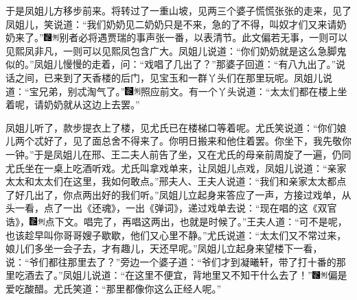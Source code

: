 于是凤姐儿方移步前来。将转过了一重山坡，见两三个婆子慌慌张张的走来，见了凤姐儿，笑说道：``我们奶奶见二奶奶只是不来，急的了不得，叫奴才们又来请奶奶来了。''{\includegraphics[width=3mm]{../Images/00006}\includegraphics[width=3mm]{../Images/00011}\footnotesize \kaishu 别者必将遇贾瑞的事声张一番，以表清节。此文偏若无事，一则可以见熙凤非凡，一则可以见熙凤包含广大。}凤姐儿说道：``你们奶奶就是这么急脚鬼似的。''凤姐儿慢慢的走着，问：``戏唱了几出了？''那婆子回道：``有八九出了。''说话之间，已来到了天香楼的后门，见宝玉和一群丫头们在那里玩呢。凤姐儿说道：``宝兄弟，别忒淘气了。''{\includegraphics[width=3mm]{../Images/00006}\includegraphics[width=3mm]{../Images/00011}\footnotesize \kaishu 照应前文。}有一个丫头说道：``太太们都在楼上坐着呢，请奶奶就从这边上去罢。''

凤姐儿听了，款步提衣上了楼，见尤氏已在楼梯口等着呢。尤氏笑说道：``你们娘儿两个忒好了，见了面总舍不得来了。你明日搬来和他住着罢。你坐下，我先敬你一钟。''于是凤姐儿在邢、王二夫人前告了坐，又在尤氏的母亲前周旋了一遍，仍同尤氏坐在一桌上吃酒听戏。尤氏叫拿戏单来，让凤姐儿点戏，凤姐儿说道：``亲家太太和太太们在这里，我如何敢点。''邢夫人、王夫人说道：``我们和亲家太太都点了好几出了，你点两出好的我们听。''凤姐儿立起身来答应了一声，方接过戏单，从头一看，点了一出《还魂》，一出《弹词》，递过戏单去说：``现在唱的这《双官诰》，{\includegraphics[width=3mm]{../Images/00006}\includegraphics[width=3mm]{../Images/00011}\footnotesize \kaishu 点下文。}唱完了，再唱这两出，也就是时候了。''王夫人道：``可不是呢，也该趁早叫你哥哥嫂子歇歇，他们又心里不静。''尤氏说道：``太太们又不常过来，娘儿们多坐一会子去，才有趣儿，天还早呢。''凤姐儿立起身来望楼下一看，说：``爷们都往那里去了？''旁边一个婆子道：``爷们才到凝曦轩，带了打十番的那里吃酒去了。''凤姐儿说道：``在这里不便宜，背地里又不知干什么去了！''{\includegraphics[width=3mm]{../Images/00006}\includegraphics[width=3mm]{../Images/00011}\footnotesize \kaishu 偏是爱吃酸醋。}尤氏笑道：``那里都像你这么正经人呢。''

